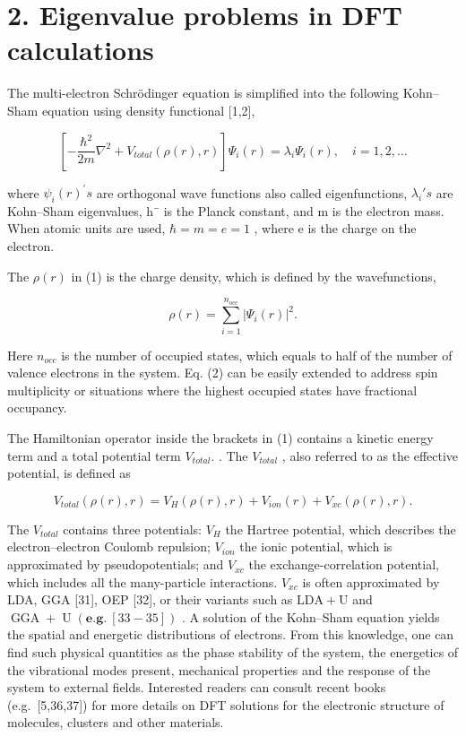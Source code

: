 \documentclass[
  10
]{article}
\begin{document}
\section{2. Eigenvalue problems in DFT
calculations}\label{eigenvalue-problems-in-dft-calculations}

The multi-electron Schrödinger equation is simplified into the following
Kohn--Sham equation using density functional {[}1,2{]},

\[
\left[ - \frac {\hbar^ {2}}{2 m} \nabla^ {2} + V _ {t o t a l} (\rho (r), r) \right] \Psi_ {i} (r) = \lambda_ {i} \Psi_ {i} (r), \quad i = 1, 2, \dots \tag {1}
\]

where \({ \psi } _ { i } ( r ) ^ { \prime } s\) are orthogonal wave
functions also called eigenfunctions, \(\lambda _ { i } { ' } s\) are
Kohn--Sham eigenvalues, h¯ is the Planck constant, and m is the electron
mass. When atomic units are used, \(\hbar = m = e = 1\) , where e is the
charge on the electron.

The \(\rho ( r )\) in (1) is the charge density, which is defined by the
wavefunctions,

\[
\rho (r) = \sum_ {i = 1} ^ {n _ {\text {occ}}} \left| \Psi_ {i} (r) \right| ^ {2}. \tag {2}
\]

Here \(n _ { o c c }\) is the number of occupied states, which equals to
half of the number of valence electrons in the system. Eq. (2) can be
easily extended to address spin multiplicity or situations where the
highest occupied states have fractional occupancy.

The Hamiltonian operator inside the brackets in (1) contains a kinetic
energy term and a total potential term \(V _ { t o t a l } .\) . The
\(V _ { t o t a l }\) , also referred to as the effective potential, is
defined as

\[
V _ {t o t a l} (\rho (r), r) = V _ {H} (\rho (r), r) + V _ {i o n} (r) + V _ {x c} (\rho (r), r). \tag {3}
\]

The \(V _ { t o t a l }\) contains three potentials: \(V _ { H }\) the
Hartree potential, which describes the electron--electron Coulomb
repulsion; \(V _ { i o n }\) the ionic potential, which is approximated
by pseudopotentials; and \(V _ { x c }\) the exchange-correlation
potential, which includes all the many-particle interactions.
\(V _ { x c }\) is often approximated by LDA, GGA {[}31{]}, OEP
{[}32{]}, or their variants such as
\(\mathrm { L D A } + \mathrm { U }\) and
\(\operatorname { G G A } + \operatorname { U } \left( \mathbf { e . g . } \ [ 3 3 - 3 5 ] \right)\)
. A solution of the Kohn--Sham equation yields the spatial and energetic
distributions of electrons. From this knowledge, one can find such
physical quantities as the phase stability of the system, the energetics
of the vibrational modes present, mechanical properties and the response
of the system to external fields. Interested readers can consult recent
books (e.g.~{[}5,36,37{]}) for more details on DFT solutions for the
electronic structure of molecules, clusters and other materials.
\end{document}
